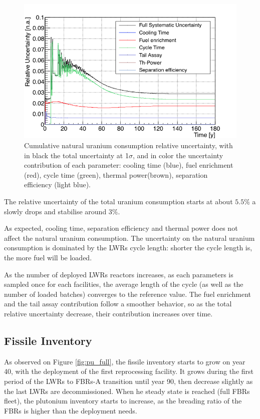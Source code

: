 \documentclass{anstrans}
\begin{document}
\begin{figure}[h!!] %
    \centering
    \includegraphics[scale=0.35]{unat_uncer}
    \caption{Cumulative natural uranium consumption relative uncertainty, with
    in black the total uncertainty at 1$\sigma$, and in color the uncertainty
    contribution of each parameter: cooling time (blue), fuel enrichment (red),
    cycle time (green), thermal power(brown), separation efficiency (light
    blue).}\label{fig:unatr_uncer}
\end{figure}
The relative uncertainty of the total uranium consumption starts at about
$5.5\%$ a slowly drops and stabilise around $3\%$.

As expected, cooling time, separation efficiency and thermal power does not
affect the natural uranium consumption.  The uncertainty on the natural uranium
consumption is dominated by the \glspl{LWR} cycle length: shorter the cycle
length is, the more fuel will be loaded.  

As the number of deployed \glspl{LWR} reactors increases, as each parameters is
sampled once for each facilities, the average length of the cycle (as well as
the number of loaded batches) converges to the reference value.
The fuel enrichment and the tail assay contribution follow a smoother behavior,
so as the total relative uncertainty decrease, their contribution increases over
time.

\subsection{Fissile Inventory}
As observed on Figure \ref{fig:pu_full}, the fissile inventory starts to grow on
year 40, with the deployment of the first reprocessing facility. It grows
during the first period of the \glspl{LWR} to \glspl{FBR}-A transition until
year 90, then decrease slightly as the last \glspl{LWR} are decommissioned.
When he steady state is reached (full \glspl{FBR} fleet), the plutonium
inventory starts to increase, as the breading ratio of the \glspl{FBR} is higher
than the deployment needs.
\end{document}
